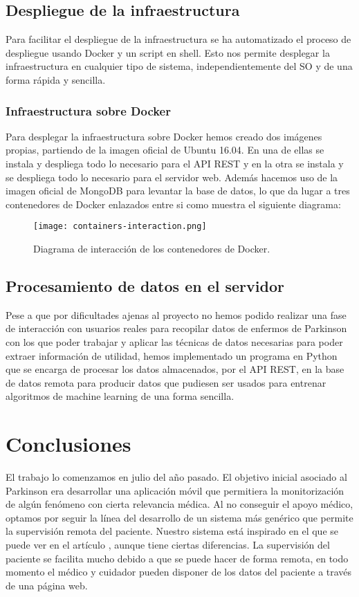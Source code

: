 \documentclass[11pt,spanish]{article}
\begin{document}
\subsection{Despliegue de la infraestructura}

Para facilitar el despliegue de la infraestructura se ha automatizado el proceso de despliegue usando Docker y un script en shell. Esto nos permite desplegar la infraestructura en cualquier tipo de sistema, independientemente del SO y de una forma rápida y sencilla.

\subsubsection{Infraestructura sobre Docker}
Para desplegar la infraestructura sobre Docker hemos creado dos imágenes propias, partiendo de la imagen oficial de Ubuntu 16.04. En una de ellas se instala y despliega todo lo necesario para el API REST y en la otra se instala y se despliega todo lo necesario para el servidor web. Además hacemos uso de la imagen oficial de MongoDB para levantar la base de datos, lo que da lugar a tres contenedores de Docker enlazados entre si como muestra el siguiente diagrama:

\begin{figure}[H]
  \centering
  \texttt{[image: containers-interaction.png]}
  \caption{Diagrama de interacción de los contenedores de Docker.}
\end{figure}

\subsection{Procesamiento de datos en el servidor}

Pese a que por dificultades ajenas al proyecto no hemos podido realizar una fase de interacción con usuarios reales para recopilar datos de enfermos de Parkinson con los que poder trabajar y aplicar las técnicas de datos necesarias para poder extraer información de utilidad, hemos implementado un programa en Python que se encarga de procesar los datos almacenados, por el API REST, en la base de datos remota para producir datos que pudiesen ser usados para entrenar algoritmos de machine learning de una forma sencilla.
\newpage

\section{Conclusiones}
El trabajo lo comenzamos en julio del año pasado. El objetivo inicial asociado al Parkinson era desarrollar una aplicación móvil que permitiera la monitorización de algún fenómeno con cierta relevancia médica. Al no conseguir el apoyo médico, optamos por seguir la línea del desarrollo de un sistema más genérico que permite la supervisión remota del paciente. Nuestro sistema está inspirado en el que se puede ver en el artículo \cite{resumen1}, aunque tiene ciertas diferencias. La supervisión del paciente se facilita mucho debido a que se puede hacer de forma remota, en todo momento el médico y cuidador pueden disponer de los datos del paciente a través de una página web.
\newline
\end{document}
